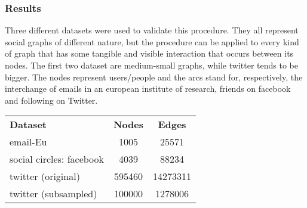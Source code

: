 \documentclass{article}
\begin{document}
				\subsubsection{Results}
				Three different datasets were used to validate this procedure. They all represent social graphs of different nature, but the procedure can be applied to every kind of graph that has some tangible and visible interaction that occurs between its nodes. The first two dataset are medium-small graphs, while twitter tends to be bigger. The nodes represent users/people and the arcs stand for, respectively, the interchange of emails in an european institute of research, friends on facebook and following on Twitter.
				\begin{center}
					\begin{tabular}{l | c | c}
						\textbf{Dataset} & \textbf{Nodes} & \textbf{Edges} \\
						email-Eu & 1005 & 25571 \\
						social circles: facebook & 4039 & 88234 \\
						twitter (original) & 595460 & 14273311\\
						twitter (subsampled) & 100000 & 1278006
					\end{tabular}	
				\end{center}
			
\end{document}
